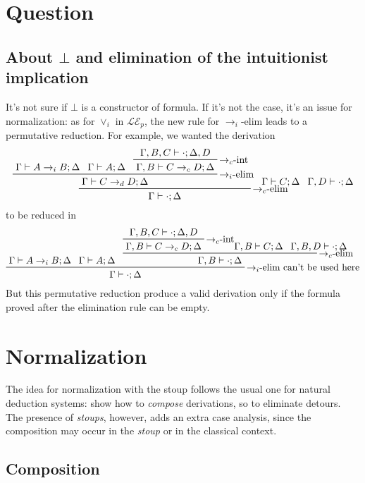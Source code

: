 \documentclass{article}
\newcommand{\stoup}{\emph{stoup}}
\newcommand{\efc}{$\to_c$-elim}
\newcommand{\efi}{$\to_i$-elim}
\newcommand{\ifc}{$\to_c$-int}
\begin{document}

\section*{Question}
\subsection*{About $\bot$ and elimination of the intuitionist implication}
It's not sure if $\bot$ is a constructor of formula. If it's not the case, it's an issue for normalization: as for $\vee_i$ in $\mathcal{LE}_p$, the new rule for \efi{} leads to a permutative reduction. For example, we wanted the derivation
\[\prftree[r]{\efc{}}{
    \prftree[r]{\efi{}}{
      \Gamma\vdash A\to_i B; \Delta}{
      \Gamma\vdash A; \Delta}{
      \prftree[r]{\ifc}{
        \Gamma, B, C\vdash\cdot; \Delta, D}{
        \Gamma, B\vdash C\to_c D; \Delta}}{
      \Gamma\vdash C\to_d D; \Delta}}{
    \Gamma\vdash C; \Delta}{
    \Gamma, D\vdash \cdot; \Delta}{
    \Gamma\vdash \cdot; \Delta}
\]
to be reduced in
\[\prftree[r]{\efi{} can't be used here}{
    \Gamma\vdash A\to_i B; \Delta}{
    \Gamma\vdash A; \Delta}{
    \prftree[r]{\efc}{
      \prftree[r]{\ifc}{
        \Gamma, B, C\vdash\cdot; \Delta, D}{
        \Gamma, B\vdash C\to_c D; \Delta}
      \Gamma, B\vdash C; \Delta}{
      \Gamma, B, D\vdash\cdot; \Delta}{
      \Gamma, B\vdash\cdot; \Delta}}{
    \Gamma\vdash\cdot; \Delta}
\]
But this permutative reduction produce a valid derivation only if the formula proved after the elimination rule can be empty.

\section{Normalization}\label{sec:normalization}

The idea for normalization with the stoup follows the usual one for natural deduction systems: show how to \emph{compose} derivations, so to eliminate detours. The presence of \emph{stoups}, however, adds an extra case analysis, since the composition may occur in the \stoup{} or in the classical context.

\subsection{Composition}
\end{document}
